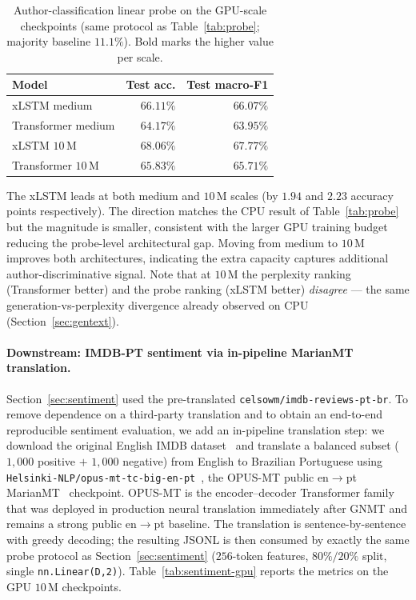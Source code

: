 \documentclass[11pt]{article}
\begin{document}
\begin{table}[h]
\centering
\caption{Author-classification linear probe on the GPU-scale
  checkpoints (same protocol as Table~\ref{tab:probe}; majority
  baseline $11.1\%$). Bold marks the higher value per scale.}
\label{tab:probe-gpu}
\small
\setlength{\tabcolsep}{6pt}
\begin{tabular}{lrr}
\toprule
Model & Test acc. & Test macro-F1 \\
\midrule
xLSTM medium        & $\mathbf{66.11\%}$ & $\mathbf{66.07\%}$ \\
Transformer medium  & $64.17\%$          & $63.95\%$          \\
\midrule
xLSTM $10$\,M       & $\mathbf{68.06\%}$ & $\mathbf{67.77\%}$ \\
Transformer $10$\,M & $65.83\%$          & $65.71\%$          \\
\bottomrule
\end{tabular}
\end{table}

The xLSTM leads at both medium and $10$\,M scales (by $1.94$ and
$2.23$ accuracy points respectively). The direction matches the
CPU result of Table~\ref{tab:probe} but the magnitude is smaller,
consistent with the larger GPU training budget reducing the
probe-level architectural gap. Moving from medium to $10$\,M
improves both architectures, indicating the extra capacity captures
additional author-discriminative signal. Note that at $10$\,M the
perplexity ranking (Transformer better) and the probe ranking
(xLSTM better) \emph{disagree} --- the same generation-vs-perplexity
divergence already observed on CPU
(Section~\ref{sec:gentext}).

\paragraph{Downstream: IMDB-PT sentiment via in-pipeline MarianMT translation.}
Section~\ref{sec:sentiment} used the pre-translated
\texttt{celsowm/imdb-reviews-pt-br}. To remove dependence on a
third-party translation and to obtain an end-to-end reproducible
sentiment evaluation, we add an in-pipeline translation step: we
download the original English IMDB
dataset~\cite{maas2011imdb} and translate a balanced subset
($1{,}000$ positive $+$ $1{,}000$ negative) from English to
Brazilian Portuguese using
\texttt{Helsinki-NLP/opus-mt-tc-big-en-pt}~\cite{tiedemann2020opus},
the OPUS-MT public en$\rightarrow$pt MarianMT~\cite{junczys2018marian}
checkpoint. OPUS-MT is the encoder--decoder Transformer family that
was deployed in production neural translation immediately after
GNMT and remains a strong public en$\rightarrow$pt baseline. The
translation is sentence-by-sentence with greedy decoding; the
resulting JSONL is then consumed by exactly the same probe protocol
as Section~\ref{sec:sentiment} ($256$-token features,
$80\%/20\%$ split, single \texttt{nn.Linear(D,2)}).
Table~\ref{tab:sentiment-gpu} reports the metrics on the GPU
$10$\,M checkpoints.
\end{document}
